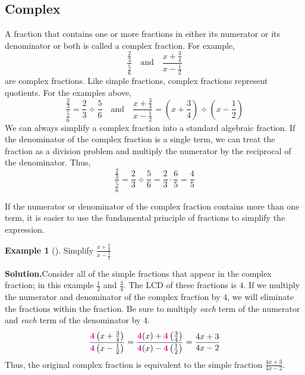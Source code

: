\documentclass[10pt,]{book}
\theoremstyle{plain}
\theoremstyle{definition}
\theoremstyle{definition}
\newtheorem{example}[theorem]{Example}
\theoremstyle{definition}
\numberwithin{equation}{part}
\newcommand{\alert}[1]{\boldsymbol{\color{magenta}{#1}}}
\begin{document}
\subsection[{Complex}]{Complex}\label{subsection-41}
A fraction that contains one or more fractions in either its numerator or its denominator or both is called a complex fraction. For example,%
\begin{equation*}
\frac{\frac{2}{3}}{\frac{5}{6}} ~~~\text{ and }~~~ \frac{x+\frac{3}{4}}{x-\frac{1}{2}}
\end{equation*}
are complex fractions. Like simple fractions, complex fractions represent quotients. For the examples above,%
\begin{equation*}
\frac{\frac{2}{3}}{\frac{5}{6}}=\frac{2}{3}\div\frac{5}{6} ~~~\text{ and }~~~ 
\frac{x+\frac{3}{4}}{x-\frac{1}{2}} = \left(x+\frac{3}{4}\right)\div\left(x-\frac{1}{2}\right)
\end{equation*}
We can always simplify a complex fraction into a standard algebraic fraction. If the denominator of the complex fraction is a single term, we can treat the fraction as a division problem and multiply the numerator by the reciprocal of the denominator. Thus,%
\begin{equation*}
\frac{\frac{2}{3}}{\frac{5}{6}}=\frac{2}{3}\div\frac{5}{6} =\frac{2}{3}\cdot\frac{6}{5} = \frac{4}{5}
\end{equation*}
%
\par
If the numerator or denominator of the complex fraction contains more than one term, it is easier to use the fundamental principle of fractions to simplify the expression.%
\begin{example}[]\label{example-67}
Simplify \(\displaystyle{\frac{x+\frac{3}{4}}{x-\frac{1}{2}} }\)%
\par\medskip\noindent%
\textbf{Solution.}\quad Consider all of the simple fractions that appear in the complex fraction; in this example \(\frac{1}{2} \) and \(\frac{3}{4} \). The LCD of these fractions is \(4\). If we multiply the numerator and denominator of the complex fraction by \(4\), we will eliminate the fractions within the fraction. Be sure to multiply \emph{each} term of the numerator and \emph{each} term of the denominator by \(4\).%
\begin{equation*}
\frac{\alert{4}\left(x+\frac{3}{4}\right)}{\alert{4}\left(x-\frac{1}{2}\right)}
= \frac{\alert{4}(x)+\alert{4}\left(\frac{3}{4}\right)}{\alert{4}(x)-\alert{4}\left(\frac{1}{2}\right)}
=\frac{4x+3}{4x-2}
\end{equation*}
Thus, the original complex fraction is equivalent to the simple fraction \(\displaystyle{\frac{4x+3}{4x-2}} \).%
\end{example}
\end{document}
